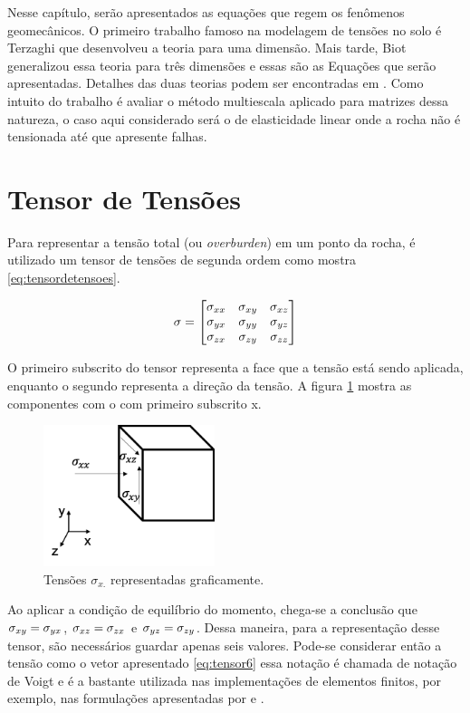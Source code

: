 Nesse capítulo, serão apresentados as equações que regem os fenômenos geomecânicos. O primeiro trabalho famoso na modelagem de tensões no solo é Terzaghi que desenvolveu a teoria para uma dimensão. Mais tarde, Biot generalizou essa teoria para três dimensões e essas são as Equações que serão apresentadas. Detalhes das duas teorias podem ser encontradas em \citet{CompGeomec}. Como intuito do trabalho é avaliar o método multiescala aplicado para matrizes dessa natureza, o caso aqui considerado será o de elasticidade linear onde a rocha não é tensionada até que apresente falhas.



\section{Tensor de Tensões}

Para representar a tensão total (ou \textit{overburden}) em um ponto da rocha, é utilizado um tensor de tensões de segunda ordem como mostra \eqref{eq:tensordetensoes}.

\begin{equation} \label{eq:tensordetensoes}
\mathbf{\sigma} =
    \begin{bmatrix}
    \sigma_{xx} & \sigma_{xy} & \sigma_{xz} \\
    \sigma_{yx} & \sigma_{yy} & \sigma_{yz} \\
    \sigma_{zx} & \sigma_{zy} & \sigma_{zz}
    \end{bmatrix}
\end{equation}

O primeiro subscrito do tensor representa a face que a tensão está sendo aplicada, enquanto o segundo representa a direção da tensão. A figura \ref{fig:tensoesx} mostra as componentes com o com primeiro subscrito x.


\begin{figure}[!htbp]
\centering
\includegraphics[width=5cm]{chap01/figs/tensor.png}
\caption{Tensões $\sigma_{x.}$ representadas graficamente.}
\label{fig:tensoesx}
\end{figure}

Ao aplicar a condição de equilíbrio do momento, chega-se a conclusão que $\sigma_{xy}=\sigma_{yx}$, $\sigma_{xz}=\sigma_{zx}$ e $\sigma_{yz}=\sigma_{zy}$. Dessa maneira, para a representação desse tensor, são necessários guardar apenas seis valores. Pode-se considerar então a tensão como o vetor apresentado \eqref{eq:tensor6} essa notação é chamada de notação de Voigt e é a bastante utilizada nas implementações de elementos finitos, por exemplo, nas formulações apresentadas por \cite{hughes} e \cite{jacob}.


